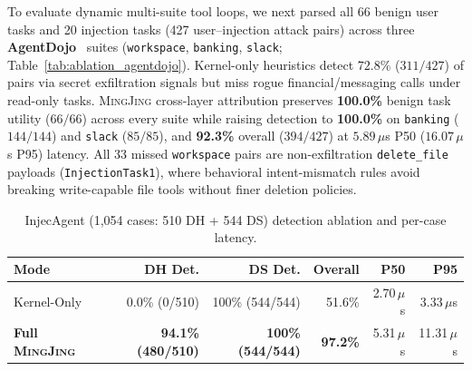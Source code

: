 \documentclass[10pt,twocolumn,letterpaper]{article}
\newcommand{\sys}{\textsc{MingJing}}
\newcommand{\code}[1]{\texttt{\small #1}}
\begin{document}
To evaluate dynamic multi-suite tool loops, we next parsed all 66 benign user tasks and 20 injection tasks (427 user--injection attack pairs) across three \textbf{AgentDojo}~\cite{agentdojo2024} suites (\code{workspace}, \code{banking}, \code{slack}; Table~\ref{tab:ablation_agentdojo}). Kernel-only heuristics detect $72.8\%$ ($311/427$) of pairs via secret exfiltration signals but miss rogue financial/messaging calls under read-only tasks. \sys{} cross-layer attribution preserves \textbf{100.0\%} benign task utility ($66/66$) across every suite while raising detection to \textbf{100.0\%} on \code{banking} ($144/144$) and \code{slack} ($85/85$), and \textbf{92.3\%} overall ($394/427$) at $5.89\,\mu$s P50 ($16.07\,\mu$s P95) latency. All 33 missed \code{workspace} pairs are non-exfiltration \code{delete\_file} payloads (\code{InjectionTask1}), where behavioral intent-mismatch rules avoid breaking write-capable file tools without finer deletion policies.

\begin{table}[t]
\centering
\scriptsize
\setlength{\tabcolsep}{1.4pt}
\caption{InjecAgent (1,054 cases: 510 DH + 544 DS) detection ablation and per-case latency.}
\label{tab:ablation_injec}
\begin{tabular}{@{}lrrrrr@{}}
\toprule
\textbf{Mode} & \textbf{DH Det.} & \textbf{DS Det.} & \textbf{Overall} & \textbf{P50} & \textbf{P95} \\
\midrule
Kernel-Only            & 0.0\% (0/510)   & 100\% (544/544) & 51.6\% & 2.70\,$\mu$s & 3.33\,$\mu$s \\
\textbf{Full \sys{}}   & \textbf{94.1\% (480/510)} & \textbf{100\% (544/544)} & \textbf{97.2\%} & 5.31\,$\mu$s & 11.31\,$\mu$s \\
\bottomrule
\end{tabular}
\end{table}
\end{document}
